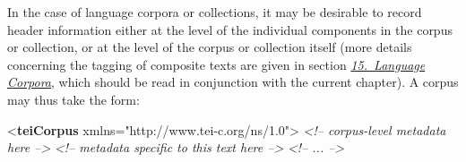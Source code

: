 In the case of language corpora or collections, it may be desirable to record header information either at the level of the individual components in the corpus or collection, or at the level of the corpus or collection itself (more details concerning the tagging of composite texts are given in section \textit{\hyperref[CC]{15.\ Language Corpora}}, which should be read in conjunction with the current chapter). A corpus may thus take the form: \par\bgroup{}\exampleFont \begin{shaded}\noindent\mbox{}{<\textbf{teiCorpus} xmlns="http://www.tei-c.org/ns/1.0">}\mbox{}\newline 
{}\mbox{}\newline 
\textit{<!-- corpus-level metadata here -->}\mbox{}\newline 
{}\mbox{}\newline 
{}\mbox{}\newline 
\hspace*{1em}\mbox{}\newline 
\textit{<!-- metadata specific to this text here -->}\mbox{}\newline 
\hspace*{1em}\mbox{}\newline 
\hspace*{1em}\mbox{}\newline 
\textit{<!-- ... -->}\mbox{}\newline 
\hspace*{1em}\mbox{}\newline 
{}\mbox{}\newline 
{}\mbox{}\newline 

\end{shaded}
